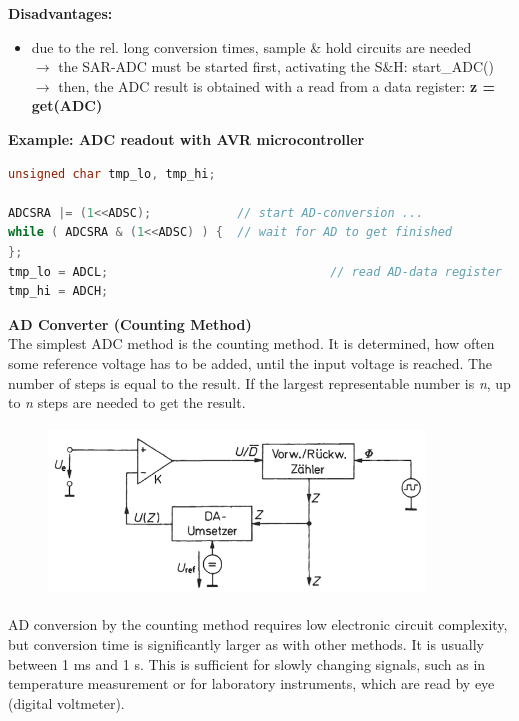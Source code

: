 \textbf{Disadvantages: }

\begin{itemize}
\item \textbf{ }due to the rel. long conversion times, sample \& hold circuits are needed \\
$\rightarrow$ the SAR-ADC must be started first, activating the S\&H:     start\_ADC()  \\
$\rightarrow$ then, the ADC result is obtained with a read from a data register:   \textbf{z = get(ADC)}
\end{itemize}

\textbf{Example: ADC readout with AVR microcontroller}\\

\begin{lstlisting}[style=mystyle, language=c]
unsigned char tmp_lo, tmp_hi;

ADCSRA |= (1<<ADSC);            // start AD-conversion ...
while ( ADCSRA & (1<<ADSC) ) {  // wait for AD to get finished
};
tmp_lo = ADCL;  							 // read AD-data register
tmp_hi = ADCH;

\end{lstlisting}

{\rot\bf AD Converter (Counting Method)}\\

The simplest ADC method is the counting method. It is determined, how often some  reference voltage has to be added, until the input voltage is reached. The number of steps is equal to the result. If the largest representable number is \textit{n}, up to \textit{n} steps are needed to get the result.

    \begin{figure}[h]
    \centering
    \includegraphics[width=10cm, height=4.5cm]{Images/image39.png}
    \label{fig:Fig }
    \end{figure}

AD conversion by the counting method requires low electronic circuit complexity, but conversion time is significantly larger as with other methods. It is usually between 1 ms and 1 s. This is sufficient for slowly changing signals, such as in temperature measurement or for laboratory instruments, which are read by eye (digital voltmeter). \\

